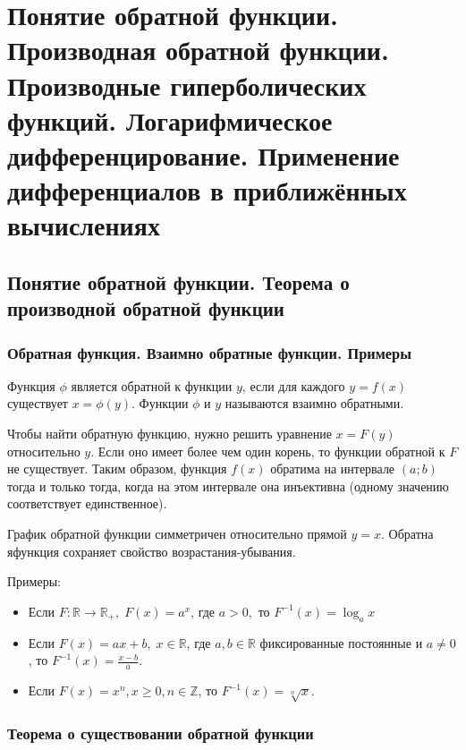 \section{Понятие обратной функции. Производная обратной функции. Производные гиперболических функций. Логарифмическое дифференцирование. Применение дифференциалов в приближённых вычислениях}

\subsection{Понятие обратной функции. Теорема о производной обратной функции}

\subsubsection{Обратная функция. Взаимно обратные функции. Примеры}

Функция $ \phi $ является обратной к функции $ y $, если для каждого $ y = f(x) $ существует $ x = \phi(y) $.
Функции $ \phi $ и $ y $ называются взаимно обратными.

Чтобы найти обратную функцию, нужно решить уравнение $x = F(y)$ относительно $y$. Если оно имеет более чем один корень, то функции обратной к $F$ не существует. Таким образом, функция $f(x)$ обратима на интервале $(a;b)$ тогда и только тогда, когда на этом интервале она инъективна (одному значению соответствует единственное).

График обратной функции симметричен относительно прямой $ y = x $. Обратна яфункция сохраняет свойство возрастания-убывания.

Примеры:

\begin{itemize}
\item
Если $F:\mathbb{R} \to \mathbb{R}_+,\; F(x) = a^x$, где $a>0,$ то $F^{-1}(x) = \log_a x$

\item
Если $F(x) = ax+b, \; x\in \mathbb{R}$, где $a,b\in \mathbb{R}$ фиксированные постоянные и $a \neq 0$, то $F^{-1}(x) = \frac{x-b}{a}.$

\item
Если $F(x)=x^n,x \ge 0, n\in \mathbb Z$, то $F^{-1}(x)=\sqrt [n] {x}.$
\end{itemize}


\subsubsection{Теорема о существовании обратной функции}

